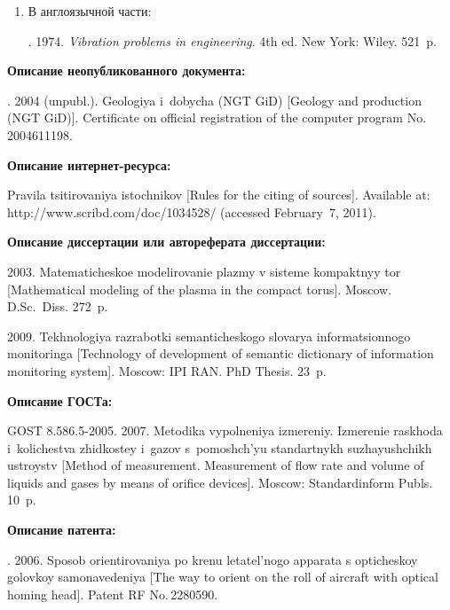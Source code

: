{\begin{enumerate}[1.]
{\begin{enumerate}[1.]
Колебания в инженерном деле~/ Пер.\ с англ.~--- М.: Машиностроение, 1985. 472~с.
(
Vibration problems in engineering.~--- 4th ed.~--- New York, NY, USA: Wiley, 1974. 521~p.)
\item  В англоязычной части:

.
1974. \textit{Vibration problems in engineering}. 4th ed. New York: 
Wiley. 521~p.
\end{enumerate}


\noindent
\textbf{Описание неопубликованного документа:}

.
2004 (unpubl.). Geologiya i~dobycha (NGT GiD) [Geology and production (NGT GiD)]. Certificate on official registration of the computer program
No.\,2004611198. 

\noindent
\textbf{Описание интернет-ресурса:}


Pravila tsitirovaniya istochnikov [Rules for the citing of sources]. Available at: {\sf
http://www.scribd.com/doc/1034528/} (accessed February~7, 2011).


\noindent
\textbf{Описание диссертации или автореферата диссертации:}

2003. Matematicheskoe modelirovanie plazmy v sisteme kompaktnyy tor [Mathematical
modeling of the plasma in the compact torus].  Moscow.  D.Sc.\ Diss. 272~p.

 2009. Tekhnologiya razrabotki semanticheskogo
slovarya informatsionnogo monitoringa [Technology of development of
semantic dictionary of information monitoring system].  Moscow: IPI RAN. PhD Thesis. 23~p.


\noindent
\textbf{Описание ГОСТа:}

GOST 8.586.5-2005. 2007. Metodika vypolneniya izmereniy. Izmerenie raskhoda i~kolichestva zhidkostey i~gazov
s~pomoshch'yu standartnykh suzhayushchikh ustroystv [Method of measurement.
Measurement of flow rate and volume of liquids and gases by means of orifice devices]. Moscow:
Standardinform  Publs. 10~p.

\noindent
\textbf{Описание патента:}

.
2006. Sposob orientirovaniya po krenu letatel'nogo
apparata s opti\-che\-skoy golovkoy
samonavedeniya [The way to orient on the roll of aircraft with optical homing head].
Patent RF No.\,2280590.
}


\end{enumerate}}
